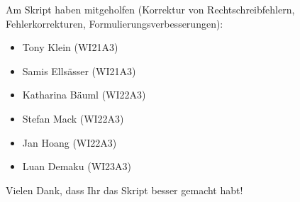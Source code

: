 Am Skript haben mitgeholfen
(Korrektur von Rechtschreibfehlern, Fehlerkorrekturen, Formulierungsverbesserungen):
\begin{itemize}
\item Tony Klein (WI21A3)
\item Samis Ellsässer (WI21A3)
\item Katharina Bäuml (WI22A3)
\item Stefan Mack (WI22A3)
\item Jan Hoang (WI22A3)
\item Luan Demaku (WI23A3)
\end{itemize}
Vielen Dank, dass Ihr das Skript besser gemacht habt!

